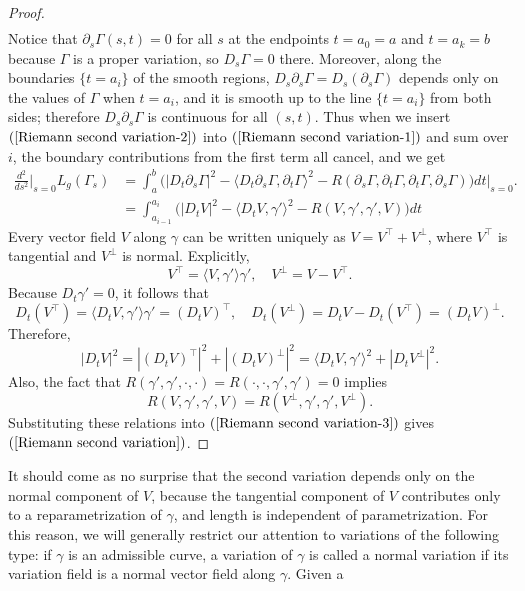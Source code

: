 \begin{proof}
\begin{align}
\end{align}
Notice that $\partial_s\Gamma(s,t)=0$ for all $s$ at the endpoints $t=a_0=a$ and $t=a_k=b$ because $\Gamma$ is a proper variation, so $D_s\Gamma=0$ there. Moreover, along the boundaries $\{t=a_i\}$ of the 
smooth regions, $D_s\partial_s\Gamma=D_s(\partial_s\Gamma)$ depends only on the values of $\Gamma$ when $t=a_i$, and it is smooth up to the line $\{t=a_i\}$ from both 
sides; therefore $D_s\partial_s\Gamma$ is continuous for all $(s,t)$. Thus when we insert $(\ref{Riemann second variation-2})$ into $(\ref{Riemann second variation-1})$ 
and sum over $i$, the boundary contributions from the first term all cancel, and we get
\begin{equation}\label{Riemann second variation-3}
\begin{aligned}
\frac{d^2}{ds^2}\Big|_{s=0}L_g(\Gamma_s)&=\int_{a}^{b}\big(|D_t\partial_s\Gamma|^2-\langle D_t\partial_s\Gamma,\partial_t\Gamma\rangle^2-R(\partial_s\Gamma,\partial_t\Gamma,\partial_t\Gamma,\partial_s\Gamma)\big)dt\Big|_{s=0}.\\
&=\int_{a_{i-1}}^{a_i}\big(|D_tV|^2-\langle D_tV,\gamma'\rangle^2-R(V,\gamma',\gamma',V)\big)dt
\end{aligned}
\end{equation}
Every vector field $V$ along $\gamma$ can be written uniquely as $V=V^{\top}+V^{\bot}$, where $V^{\top}$ is tangential and $V^{\bot}$ is normal. Explicitly,
\[V^{\top}=\langle V,\gamma'\rangle\gamma',\quad V^{\bot}=V-V^{\top}.\]
Because $D_t\gamma'=0$, it follows that
\[D_t(V^{\top})=\langle D_tV,\gamma'\rangle\gamma'=(D_tV)^{\top},\quad D_t(V^{\bot})=D_tV-D_t(V^{\top})=(D_tV)^{\bot}.\]
Therefore,
\[|D_tV|^2=|(D_tV)^{\top}|^2+|(D_tV)^{\bot}|^2=\langle D_tV,\gamma'\rangle^2+|D_tV^{\bot}|^2.\]
Also, the fact that $R(\gamma',\gamma',\cdot,\cdot)=R(\cdot,\cdot,\gamma',\gamma')=0$ implies
\[R(V,\gamma',\gamma',V)=R(V^{\bot},\gamma',\gamma',V^{\bot}).\]
Substituting these relations into $(\ref{Riemann second variation-3})$ gives $(\ref{Riemann second variation})$.
\end{proof}
It should come as no surprise that the second variation depends only on the normal component of $V$, because the tangential component of $V$ contributes only to a 
reparametrization of $\gamma$, and length is independent of parametrization. For this reason, we will generally restrict our attention to variations of the following 
type: if $\gamma$ is an admissible curve, a variation of $\gamma$ is called a normal variation if its variation field is a normal vector field along $\gamma$. Given a 
